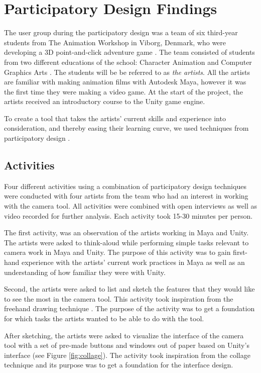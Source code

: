 \section{Participatory Design Findings} \label{PD_Findings}
The user group during the participatory design was a team of six third-year students from The Animation Workshop in Viborg, Denmark, who were developing a 3D point-and-click adventure game \cite{adventure_genre}. The team consisted of students from two different educations of the school: Character Animation and Computer Graphics Arts \cite{taw_degrees}. The students will be be referred to as \textit{the artists}. All the artists are familiar with making animation films with Autodesk Maya, however it was the first time they were making a video game. At the start of the project, the artists received an introductory course to the Unity game engine.

To create a tool that takes the artists' current skills and experience into consideration, and thereby easing their learning curve, we used techniques from participatory design \cite{part_design}.

\subsection{Activities}
Four different activities using a combination of participatory design techniques were conducted with four artists from the team who had an interest in working with the camera tool. All activities were combined with open interviews as well as video recorded for further analysis. Each activity took 15-30 minutes per person.

The first activity, was an observation \cite{part_design} of the artists working in Maya and Unity. The artists were asked to think-aloud \cite{part_design} while performing simple tasks relevant to camera work in Maya and Unity. The purpose of this activity was to gain first-hand experience with the artists' current work practices in Maya as well as an understanding of how familiar they were with Unity.

Second, the artists were asked to list and sketch the features that they would like to see the most in the camera tool. This activity took inspiration from the freehand drawing technique \cite{part_design}. The purpose of the activity was to get a foundation for which tasks the artists wanted to be able to do with the tool.

After sketching, the artists were asked to visualize the interface of the camera tool with a set of pre-made buttons and windows out of paper based on Unity's interface (see Figure \ref{fig:collage}). The activity took inspiration from the collage technique \cite{part_design} and its purpose was to get a foundation for the interface design.

